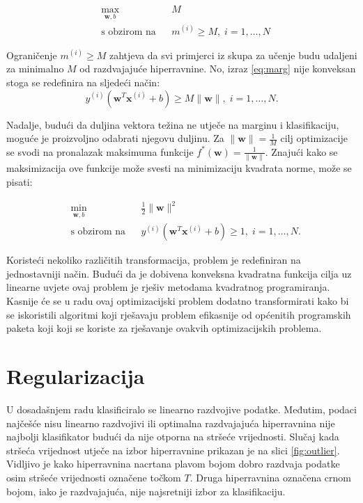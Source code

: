 \documentclass[times, utf8, zavrsni, numeric]{fer}
\begin{document}
\begin{equation}
\begin{aligned}
& \underset{\mathbf{w}, b}{\text{max}}
& & M \\
& \text{s obzirom na}
& & m^{(i)} \geq M, \; i = 1, \ldots, N
\end{aligned}
\end{equation}

\par Ograničenje $m^{(i)} \geq M$ zahtjeva da svi primjerci iz skupa za učenje budu udaljeni za minimalno $M$
od razdvajajuće hiperravnine. 
No, izraz \ref{eq:marg} nije konveksan stoga se redefinira na sljedeći način:
\begin{equation*}
  y^{(i)}(\mathbf{w}^T\mathbf{x}^{(i)} + b) \geq M\|\mathbf{w}\|, \; i = 1, \ldots, N.
\end{equation*}

Nadalje, budući da duljina vektora težina ne utječe na marginu i klasifikaciju, moguće je proizvoljno odabrati
njegovu duljinu.
Za $\|\mathbf{w}\|=\frac{1}{M}$ cilj optimizacije se svodi na pronalazak maksimuma funkcije 
$f^*(\mathbf{w}) = \frac{1}{\|\mathbf{w}\|}$. Znajući kako se maksimizacija ove funkcije može svesti na 
minimizaciju kvadrata norme, može se pisati:

\begin{equation}
\begin{aligned}
& \underset{\mathbf{w}, b}{\text{min}}
& & \frac{1}{2}\|\mathbf{w}\|^2 \\
& \text{s obzirom na}
& & y^{(i)}(\mathbf{w}^T\mathbf{x}^{(i)} + b) \geq 1, \; i = 1, \ldots, N.
\end{aligned}
\end{equation}

\par Koristeći nekoliko različitih transformacija, problem je redefiniran na jednostavniji način.
Budući da je dobivena konveksna kvadratna funkcija cilja uz linearne uvjete ovaj problem je rješiv
metodama kvadratnog programiranja. Kasnije će se u radu ovaj optimizacijski problem dodatno transformirati
kako bi se iskoristili algoritmi koji rješavaju problem efikasnije od općenitih programskih paketa koji
koji se koriste za rješavanje ovakvih optimizacijskih problema. 

\section{Regularizacija} \label{reg}
U dosadašnjem radu klasificiralo se linearno razdvojive podatke. 
Međutim, podaci najčešće nisu linearno razdvojivi ili optimalna razdvajajuća hiperravnina nije najbolji
klasifikator budući da nije otporna na stršeće vrijednosti.
Slučaj kada stršeća vrijednost utječe na izbor hiperravnine prikazan je na slici \ref{fig:outlier}.
Vidljivo je kako hiperravnina nacrtana plavom bojom dobro razdvaja podatke osim stršeće vrijednosti 
označene točkom $T$. Druga hiperravnina označena crnom bojom, iako je razdvajajuća, nije 
najsretniji izbor za klasifikaciju.
\end{document}
